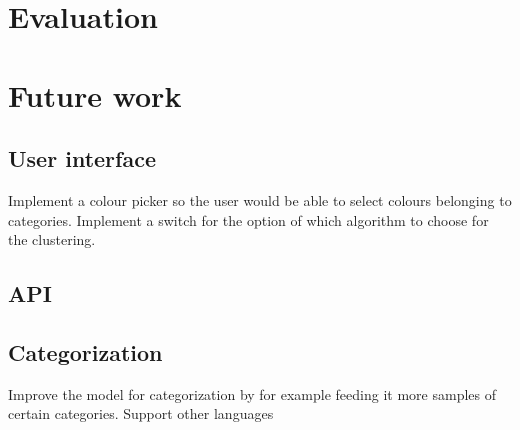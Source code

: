 \section{Evaluation}

\section{Future work}
\subsection{User interface}
Implement a colour picker so the user would be able to select colours belonging to categories. 
Implement a switch for the option of which algorithm to choose for the clustering.
\subsection{API}
\subsection{Categorization}
Improve the model for categorization by for example feeding it more samples of certain categories. 
Support other languages
